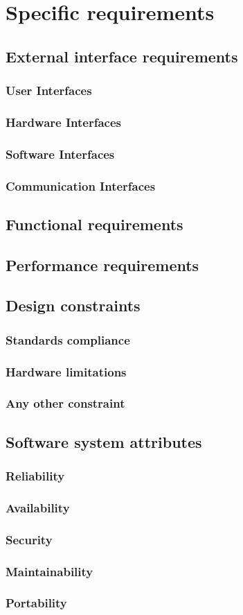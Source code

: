 \section{Specific requirements}

\subsection{External interface requirements}
\subsubsection{User Interfaces}
\subsubsection{Hardware Interfaces}
\subsubsection{Software Interfaces}
\subsubsection{Communication Interfaces}
\subsection{Functional requirements}
\subsection{Performance requirements}
\subsection{Design constraints}
\subsubsection{Standards compliance}
\subsubsection{Hardware limitations}
\subsubsection{Any other constraint}
\subsection{Software system attributes}
\subsubsection{Reliability}
\subsubsection{Availability}
\subsubsection{Security}
\subsubsection{Maintainability}
\subsubsection{Portability}